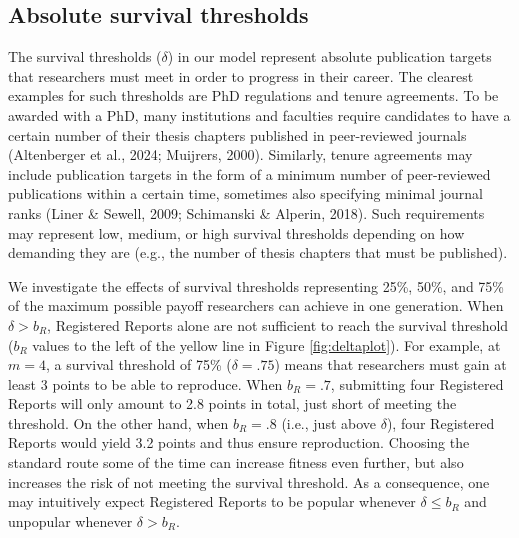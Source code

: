 \documentclass[
  british,
  a4paper,
  ,man,mask,floatsintext]{apa6}
\begin{document}
\subsection{Absolute survival thresholds}\label{absolute-survival-thresholds}

The survival thresholds (\(\delta\)) in our model represent absolute publication targets that researchers must meet in order to progress in their career.
The clearest examples for such thresholds are PhD regulations and tenure agreements.
To be awarded with a PhD, many institutions and faculties require candidates to have a certain number of their thesis chapters published in peer-reviewed journals (Altenberger et al., 2024; Muijrers, 2000).
Similarly, tenure agreements may include publication targets in the form of a minimum number of peer-reviewed publications within a certain time, sometimes also specifying minimal journal ranks (Liner \& Sewell, 2009; Schimanski \& Alperin, 2018).
Such requirements may represent low, medium, or high survival thresholds depending on how demanding they are (e.g., the number of thesis chapters that must be published).

We investigate the effects of survival thresholds representing 25\%, 50\%, and 75\% of the maximum possible payoff researchers can achieve in one generation.
When \(\delta > b_{R}\), Registered Reports alone are not sufficient to reach the survival threshold (\(b_{R}\) values to the left of the yellow line in Figure \ref{fig:deltaplot}).
For example, at \(m = 4\), a survival threshold of 75\% (\(\delta = .75\)) means that researchers must gain at least 3 points to be able to reproduce.
When \(b_{R} = .7\), submitting four Registered Reports will only amount to 2.8 points in total, just short of meeting the threshold.
On the other hand, when \(b_{R} = .8\) (i.e., just above \(\delta\)), four Registered Reports would yield 3.2 points and thus ensure reproduction.
Choosing the standard route some of the time can increase fitness even further, but also increases the risk of not meeting the survival threshold.
As a consequence, one may intuitively expect Registered Reports to be popular whenever \(\delta \leq b_{R}\) and unpopular whenever \(\delta > b_{R}\).
\end{document}
